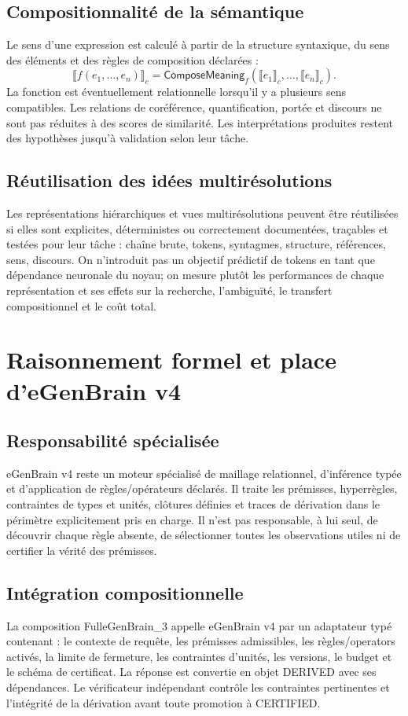 \documentclass[11pt,a4paper]{article}
\newcommand{\State}[1]{\textsf{#1}}
\begin{document}
\subsection{Compositionnalité de la sémantique}
Le sens d'une expression est calculé à partir de la structure syntaxique, du sens des éléments et des règles de composition déclarées :
\[
\llbracket f(e_1,\ldots,e_n)\rrbracket_c = \mathsf{ComposeMeaning}_f(\llbracket e_1\rrbracket_c,\ldots,\llbracket e_n\rrbracket_c).
\]
La fonction est éventuellement relationnelle lorsqu'il y a plusieurs sens compatibles. Les relations de coréférence, quantification, portée et discours ne sont pas réduites à des scores de similarité. Les interprétations produites restent des hypothèses jusqu'à validation selon leur tâche.

\subsection{Réutilisation des idées multirésolutions}
Les représentations hiérarchiques et vues multirésolutions peuvent être réutilisées si elles sont explicites, déterministes ou correctement documentées, traçables et testées pour leur tâche : chaîne brute, tokens, syntagmes, structure, références, sens, discours. On n'introduit pas un objectif prédictif de tokens en tant que dépendance neuronale du noyau; on mesure plutôt les performances de chaque représentation et ses effets sur la recherche, l'ambiguïté, le transfert compositionnel et le coût total.

\section{Raisonnement formel et place d'eGenBrain v4}
\subsection{Responsabilité spécialisée}
eGenBrain v4 reste un moteur spécialisé de maillage relationnel, d'inférence typée et d'application de règles/opérateurs déclarés. Il traite les prémisses, hyperrègles, contraintes de types et unités, clôtures définies et traces de dérivation dans le périmètre explicitement pris en charge. Il n'est pas responsable, à lui seul, de découvrir chaque règle absente, de sélectionner toutes les observations utiles ni de certifier la vérité des prémisses.

\subsection{Intégration compositionnelle}
La composition FulleGenBrain\_3 appelle eGenBrain v4 par un adaptateur typé contenant : le contexte de requête, les prémisses admissibles, les règles/operators activés, la limite de fermeture, les contraintes d'unités, les versions, le budget et le schéma de certificat. La réponse est convertie en objet \State{DERIVED} avec ses dépendances. Le vérificateur indépendant contrôle les contraintes pertinentes et l'intégrité de la dérivation avant toute promotion à \State{CERTIFIED}.
\end{document}
